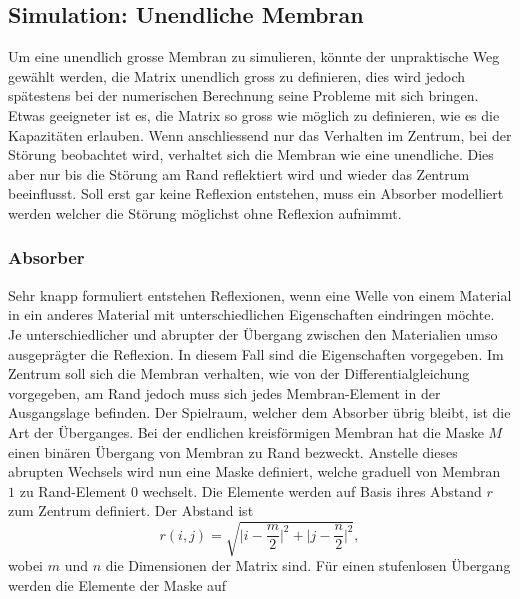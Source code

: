 \subsection{Simulation: Unendliche Membran}
Um eine unendlich grosse Membran zu simulieren, könnte der unpraktische Weg gewählt werden, die Matrix unendlich gross zu definieren, dies wird jedoch spätestens bei der numerischen Berechnung seine Probleme mit sich bringen.
Etwas geeigneter ist es, die Matrix so gross wie möglich zu definieren, wie es die Kapazitäten erlauben.
Wenn anschliessend nur das Verhalten im Zentrum, bei der Störung beobachtet wird, verhaltet sich die Membran wie eine unendliche. 
Dies aber nur bis die Störung am Rand reflektiert wird und wieder das Zentrum beeinflusst.
Soll erst gar keine Reflexion entstehen, muss ein Absorber modelliert werden welcher die Störung möglichst ohne Reflexion aufnimmt.

\subsubsection{Absorber}
%
Sehr knapp formuliert entstehen Reflexionen, wenn eine Welle von einem Material in ein anderes Material mit unterschiedlichen Eigenschaften eindringen möchte.
Je unterschiedlicher und abrupter der Übergang zwischen den Materialien umso ausgeprägter die Reflexion.
In diesem Fall sind die Eigenschaften vorgegeben.
Im Zentrum soll sich die Membran verhalten, wie von der Differentialgleichung vorgegeben, am Rand jedoch muss sich jedes Membran-Element in der Ausgangslage befinden. 
Der Spielraum, welcher dem Absorber übrig bleibt, ist die Art der Überganges.
Bei der endlichen kreisförmigen Membran hat die Maske $M$ einen binären Übergang von Membran zu Rand bezweckt.
Anstelle dieses abrupten Wechsels wird nun eine Maske definiert, welche graduell von Membran $1$ zu Rand-Element $0$ wechselt.
Die Elemente werden auf Basis ihres Abstand $r$ zum Zentrum definiert. 
Der Abstand ist 
\begin{equation*}
	r(i,j)
	=
	\sqrt{\biggl|i-\frac{m}{2}\biggr|^2+\biggl|j-\frac{n}{2}\biggr|^2},
\end{equation*} 
wobei $ m $ und $n$ die Dimensionen der Matrix sind.
Für einen stufenlosen Übergang werden die Elemente der Maske auf 

